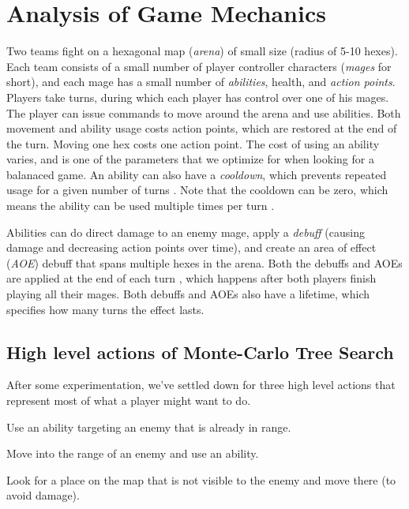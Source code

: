 \chapter{Analysis of Game Mechanics}

Two teams fight on a hexagonal map (\emph{arena}) of small size (radius of 5-10
hexes).   Each team consists of a small number of
player controller characters (\emph{mages} for short), and each mage has a small
number of \emph{abilities}, health, and \emph{action points}. Players take turns,
during which each player has control over one of his mages. The player can
issue commands to move around the arena and use abilities. Both movement and
ability usage costs action points, which are restored at the end of the turn.
Moving one hex costs one action point. The cost of using an ability varies, and
is one of the parameters that we optimize for when looking for a balanaced
game. An ability can also have a \emph{cooldown}, which prevents repeated usage
for a given number of turns . Note that the
cooldown can be zero, which means the ability can be used multiple times per
turn .

Abilities can do direct damage to an enemy mage, apply a \emph{debuff} (causing
damage and decreasing action points over time), and create an area of effect
(\emph{AOE}) debuff that spans multiple hexes in the arena. Both the debuffs and
AOEs are applied at the end of each turn , which happens after both players finish playing all their mages.
Both debuffs and AOEs also have a lifetime, which specifies how many turns
 the effect lasts.



\section{High level actions of Monte-Carlo Tree Search}

After some experimentation, we've settled down for three high level actions
that represent most of what a player might want to do.

\begin{description}[align=right,labelwidth=3cm]
\item [AbilityUse] Use an ability targeting an enemy that is already in range.
\item [AttackMove] Move into the range of an enemy and use an ability.
\item [DefensiveMove] Look for a place on the map that is not visible to the enemy and move there (to avoid damage).
\end{description}

